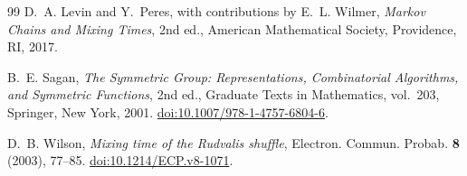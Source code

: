 \documentclass[11pt]{article}
\theoremstyle{remark}
\begin{document}
\begin{thebibliography}{99}
D.~A. Levin and Y.~Peres, with contributions by E.~L. Wilmer,
\emph{Markov Chains and Mixing Times}, 2nd ed.,
American Mathematical Society, Providence, RI, 2017.

B.~E. Sagan,
\emph{The Symmetric Group: Representations, Combinatorial Algorithms, and Symmetric Functions},
2nd ed., Graduate Texts in Mathematics, vol.~203,
Springer, New York, 2001.
\href{https://doi.org/10.1007/978-1-4757-6804-6}{doi:10.1007/978-1-4757-6804-6}.

D.~B. Wilson,
\emph{Mixing time of the Rudvalis shuffle},
Electron. Commun. Probab. \textbf{8} (2003), 77--85.
\href{https://doi.org/10.1214/ECP.v8-1071}{doi:10.1214/ECP.v8-1071}.

\end{thebibliography}
\end{document}
